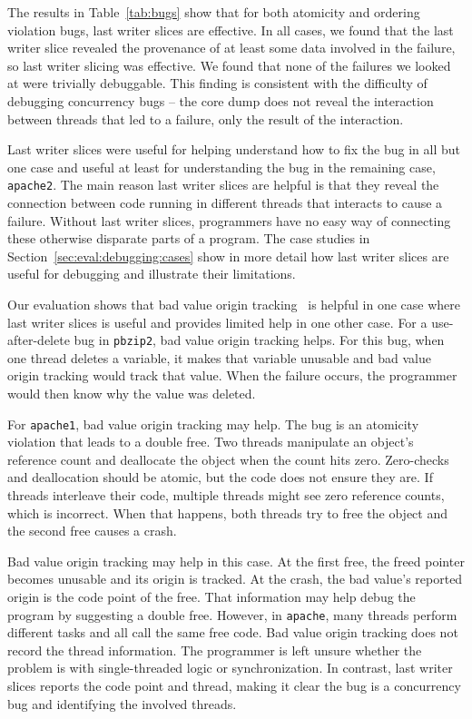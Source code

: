 \documentclass[preprint,10pt]{sigplanconf}
\begin{document}
The results in Table~\ref{tab:bugs} show that for both atomicity and ordering
violation bugs, last writer slices are effective.  In all cases, we found that
the last writer slice revealed the provenance of at least some data involved in
the failure, so last writer slicing was effective.  We found that none of the
failures we looked at were trivially debuggable.  This finding is consistent
with the difficulty of debugging concurrency bugs -- the core dump does not
reveal the interaction between threads that led to a failure, only the result
of the interaction.  

Last writer slices were useful for helping understand how to fix the bug in
all but one case and useful at least for understanding the bug in the
remaining case, {\tt apache2}.  The main reason last writer slices are helpful
is that they reveal the connection between code running in different threads
that interacts to cause a failure.  Without last writer slices, programmers
have no easy way of connecting these otherwise disparate parts of a program.
The case studies in Section~\ref{sec:eval:debugging:cases} show in more detail
how last writer slices are useful for debugging and illustrate their limitations.


Our evaluation shows that bad value origin tracking~\cite{badapples} is
helpful in one case where last writer slices is useful and provides limited help
in one other case.  For a use-after-delete bug in {\tt pbzip2}, bad value
origin tracking helps.  For this bug, when one thread deletes a variable, it
makes that variable unusable and bad value origin tracking would track that
value.  When the failure occurs, the programmer would then know why the value
was deleted.  

For {\tt apache1}, bad value origin tracking may help.  The bug is an atomicity
violation that leads to a double free.  Two threads manipulate an object's
reference count and deallocate the object when the count hits zero. Zero-checks
and deallocation should be atomic, but the code does not ensure they are.  If
threads interleave their code, multiple threads might see zero reference
counts, which is incorrect.  When that happens, both threads try to free the
object and the second free causes a crash.  

Bad value origin tracking may help in this case.  At the first free, the freed
pointer becomes unusable and its origin is tracked.  At the crash, the bad
value's reported origin is the code point of the free. That information may
help debug the program by suggesting a double free.  However, in {\tt apache},
many threads perform different tasks and all call the same free code.  Bad
value origin tracking does not record the thread information.  The programmer
is left unsure whether the problem is with single-threaded logic or
synchronization.  In contrast, last writer slices reports the code point and
thread, making it clear the bug is a concurrency bug and identifying the
involved threads.
\end{document}
